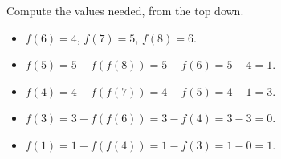 Compute the values needed, from the top down.
\begin{itemize}
\item $f(6)=4$, $f(7)=5$, $f(8)=6$.
\item $f(5)=5-f(f(8))=5-f(6)=5-4=1$.
\item $f(4)=4-f(f(7))=4-f(5)=4-1=3$.
\item $f(3)=3-f(f(6))=3-f(4)=3-3=0$.
\item $f(1)=1-f(f(4))=1-f(3)=1-0=\boxed{1}$.
\end{itemize}
